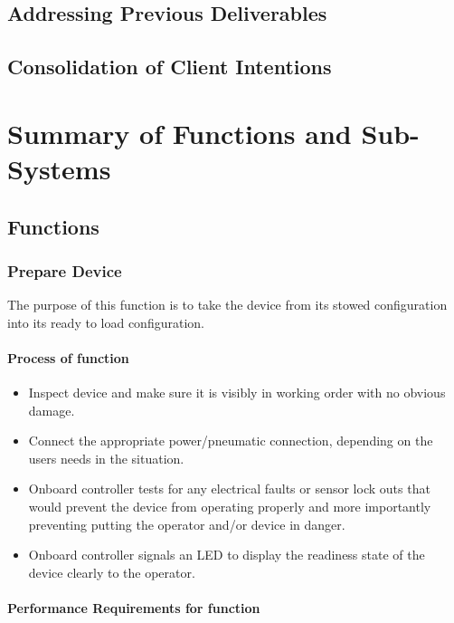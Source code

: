 \documentclass[a4paper,10pt]{article}
\begin{document}
\subsection{Addressing Previous Deliverables}

\subsection{Consolidation of Client Intentions}

\newpage

\section{Summary of Functions and Sub-Systems}

\subsection{Functions}

\subsubsection{Prepare Device}

The purpose of this function is to take the device from its stowed configuration into its ready to load configuration.

\paragraph{Process of function}


\begin{itemize}
    \item Inspect device and make sure it is visibly in working order with no obvious damage.
    \item Connect the appropriate power/pneumatic connection, depending on the users needs in the situation.
    \item Onboard controller tests for any electrical faults or sensor lock outs that would prevent the device from operating properly and more importantly preventing putting the operator and/or device in danger.
    \item Onboard controller signals an LED to display the readiness state of the device clearly to the operator.
\end{itemize}

\paragraph{Performance Requirements for function}
\end{document}
